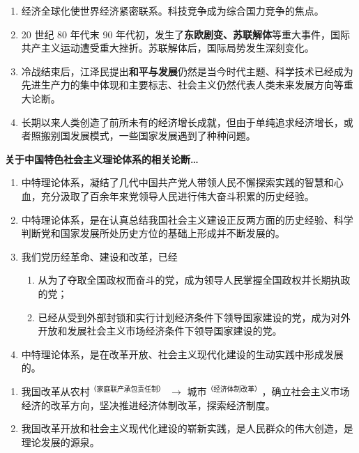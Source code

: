 \documentclass[UTF8]{ctexart}
\newcommand\Emph[2]{\colorbox{c#1-light}{\textcolor{c#1-emph}{\textbf{#2}}}}
\begin{document}
\begin{enumerate}[start=23]
  \item 经济全球化使世界经济紧密联系。科技竞争成为综合国力竞争的焦点。
  \item 20 世纪 80 年代末 90 年代初，发生了\Emph{5}{东欧剧变、苏联解体}等重大事件，国际共产主义运动遭受重大挫折。苏联解体后，国际局势发生深刻变化。
  \item 冷战结束后，江泽民提出\Emph{5}{和平与发展}仍然是当今时代主题、科学技术已经成为先进生产力的集中体现和主要标志、社会主义仍然代表人类未来发展方向等重大论断。
  \item 长期以来人类创造了前所未有的经济增长成就，但由于单纯追求经济增长，或者照搬别国发展模式，一些国家发展遇到了种种问题。
\end{enumerate}

\begin{mybox}{5}
\textbf{关于中国特色社会主义理论体系的相关论断…}
\begin{enumerate}
  \item 中特理论体系，凝结了几代中国共产党人带领人民不懈探索实践的智慧和心血，充分汲取了百余年来党领导人民进行伟大奋斗积累的历史经验。
  \item 中特理论体系，是在认真总结我国社会主义建设正反两方面的历史经验、科学判断党和国家发展所处历史方位的基础上形成并不断发展的。
  \item 我们党历经革命、建设和改革，已经
  \begin{enumerate}[label={\roman{enumii})}]
    \item 从为了夺取全国政权而奋斗的党，成为领导人民掌握全国政权并长期执政的党；
    \item 已经从受到外部封锁和实行计划经济条件下领导国家建设的党，成为对外开放和发展社会主义市场经济条件下领导国家建设的党。
  \end{enumerate}
  \item 中特理论体系，是在改革开放、社会主义现代化建设的生动实践中形成发展的。
\end{enumerate}
\end{mybox}

\begin{enumerate}[start=31]
  \item 我国改革从农村$^\text{（家庭联产承包责任制）}$ $\to$ 城市$^\text{（经济体制改革）}$，确立社会主义市场经济的改革方向，坚决推进经济体制改革，探索经济制度。
  \item 我国改革开放和社会主义现代化建设的崭新实践，是人民群众的伟大创造，是理论发展的源泉。
\end{enumerate}
\end{document}
